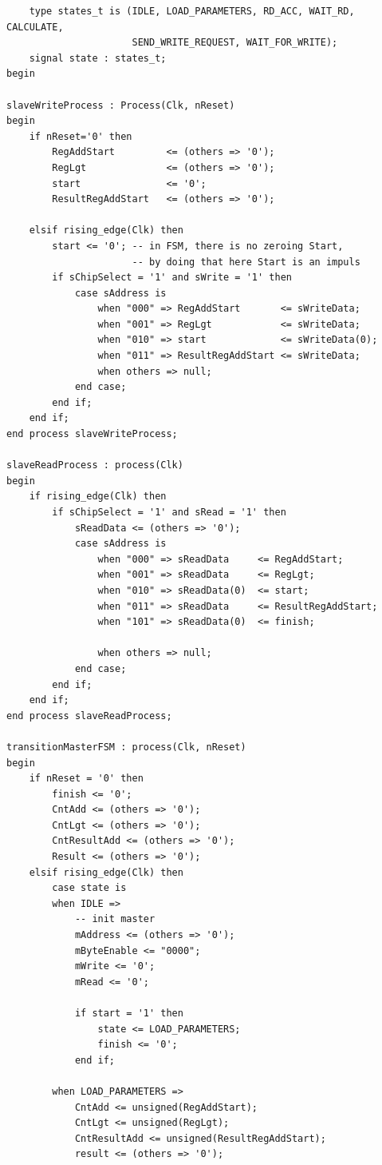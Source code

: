 \begin{appendices}
\begin{verbatim}
    type states_t is (IDLE, LOAD_PARAMETERS, RD_ACC, WAIT_RD, CALCULATE, 
                      SEND_WRITE_REQUEST, WAIT_FOR_WRITE);
    signal state : states_t;
begin 

slaveWriteProcess : Process(Clk, nReset) 
begin
    if nReset='0' then
        RegAddStart         <= (others => '0');
        RegLgt              <= (others => '0');
        start               <= '0';
        ResultRegAddStart   <= (others => '0');
    
    elsif rising_edge(Clk) then
        start <= '0'; -- in FSM, there is no zeroing Start,
                      -- by doing that here Start is an impuls
        if sChipSelect = '1' and sWrite = '1' then
            case sAddress is
                when "000" => RegAddStart       <= sWriteData; 
                when "001" => RegLgt            <= sWriteData; 
                when "010" => start             <= sWriteData(0); 
                when "011" => ResultRegAddStart <= sWriteData;
                when others => null;
            end case;
        end if;
    end if;
end process slaveWriteProcess;

slaveReadProcess : process(Clk) 
begin
    if rising_edge(Clk) then
        if sChipSelect = '1' and sRead = '1' then
            sReadData <= (others => '0');
            case sAddress is
                when "000" => sReadData     <= RegAddStart; 
                when "001" => sReadData     <= RegLgt;
                when "010" => sReadData(0)  <= start;
                when "011" => sReadData     <= ResultRegAddStart; 
                when "101" => sReadData(0)  <= finish;
                
                when others => null;
            end case;
        end if;
    end if;
end process slaveReadProcess;

transitionMasterFSM : process(Clk, nReset)
begin
    if nReset = '0' then
        finish <= '0';
        CntAdd <= (others => '0');
        CntLgt <= (others => '0');
        CntResultAdd <= (others => '0');
        Result <= (others => '0');
    elsif rising_edge(Clk) then
        case state is
        when IDLE => 
            -- init master
            mAddress <= (others => '0');
            mByteEnable <= "0000";
            mWrite <= '0';
            mRead <= '0';
            
            if start = '1' then
                state <= LOAD_PARAMETERS;
                finish <= '0';
            end if;
			
        when LOAD_PARAMETERS =>
            CntAdd <= unsigned(RegAddStart);
            CntLgt <= unsigned(RegLgt);
            CntResultAdd <= unsigned(ResultRegAddStart);
            result <= (others => '0');
            

\end{verbatim}
\end{appendices}
